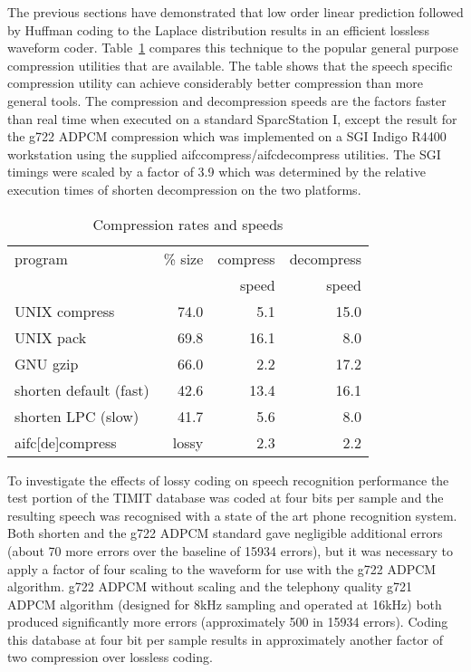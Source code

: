 The previous sections have demonstrated that low order linear prediction
followed by Huffman coding to the Laplace distribution results in an
efficient lossless waveform coder.  Table~\ref{tab:comp} compares this
technique to the popular general purpose compression utilities that are
available.  The table shows that the speech specific compression utility
can achieve considerably better compression than more general tools.
The compression and decompression speeds are the factors faster than
real time when executed on a standard SparcStation I, except the result
for the g722 ADPCM compression which was implemented on a SGI Indigo
R4400 workstation using the supplied aifccompress/aifcdecompress
utilities.  The SGI timings were scaled by a factor of 3.9 which was
determined by the relative execution times of shorten decompression on
the two platforms.
\begin{table}[htbp]
\begin{center}
\begin{tabular}{|l|r|r|r|}  \hline
program         	& \% size & compress	& decompress \\
			& 	  & speed 	& speed \\ \hline
UNIX compress   	& 74.0	  & 5.1 	& 15.0  \\
UNIX pack       	& 69.8	  & 16.1 	& 8.0   \\
GNU gzip        	& 66.0	  & 2.2 	& 17.2  \\
shorten default (fast)	& 42.6	  & 13.4	& 16.1  \\
shorten LPC (slow)	& 41.7 	  & 5.6		& 8.0	\\
aifc[de]compress	& lossy	  & 2.3		& 2.2	\\ \hline
\end{tabular}
\end{center}
\caption{Compression rates and speeds}
\label{tab:comp}
\end{table}

To investigate the effects of lossy coding on speech recognition
performance the test portion of the TIMIT database was coded at four
bits per sample and the resulting speech was recognised with a state of
the art phone recognition system.  Both shorten and the g722 ADPCM
standard gave negligible additional errors (about 70 more errors over
the baseline of 15934 errors), but it was necessary to apply a factor of
four scaling to the waveform for use with the g722 ADPCM algorithm.
g722 ADPCM without scaling and the telephony quality g721 ADPCM
algorithm (designed for 8kHz sampling and operated at 16kHz) both
produced significantly more errors (approximately 500 in 15934 errors).
Coding this database at four bit per sample results in approximately
another factor of two compression over lossless coding.

